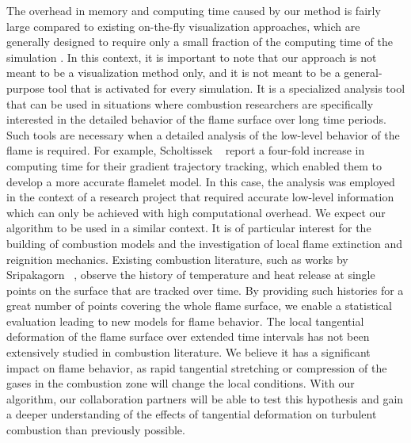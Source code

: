 %
The overhead in memory and computing time caused by our method is fairly large
compared to existing on-the-fly visualization approaches, which are generally
designed to require only a small fraction of the computing time of the
simulation \cite{Ma2009}.
%
In this context, it is important to note that our approach is not meant to be a
visualization method only, and it is not meant to be a general-purpose tool that
is activated for every simulation.
%
It is a specialized analysis tool that can be used in situations where
combustion researchers are specifically interested in the detailed behavior of
the flame surface over long time periods.
%
Such tools are necessary when a detailed analysis of the low-level behavior
of the flame is required.
%
For example, Scholtissek \etal~\cite{Scholtissek2017} report a four-fold
increase in computing time for their gradient trajectory tracking, which enabled
them to develop a more accurate flamelet model.
%
In this case, the analysis was employed in the context of a research project
that required accurate low-level information which can only be achieved with
high computational overhead.
%
We expect our algorithm to be used in a similar context.
%
It is of particular interest for the building of combustion models and the
investigation of local flame extinction and reignition mechanics.
%
Existing combustion literature, such as works by Sripakagorn
\etal~\cite{Sripakagorn2004}, observe the history of temperature and heat
release at single points on the surface that are tracked over time.
%
By providing such histories for a great number of points covering the whole
flame surface, we enable a statistical evaluation leading to new models for
flame behavior.
%
The local tangential deformation of the flame surface over extended time
intervals has not been extensively studied in combustion literature.
%
We believe it has a significant impact on flame behavior, as rapid tangential
stretching or compression of the gases in the combustion zone will change the
local conditions.
%
With our algorithm, our collaboration partners will be able to test this
hypothesis and gain a deeper understanding of the effects of tangential
deformation on turbulent combustion than previously possible.
%
